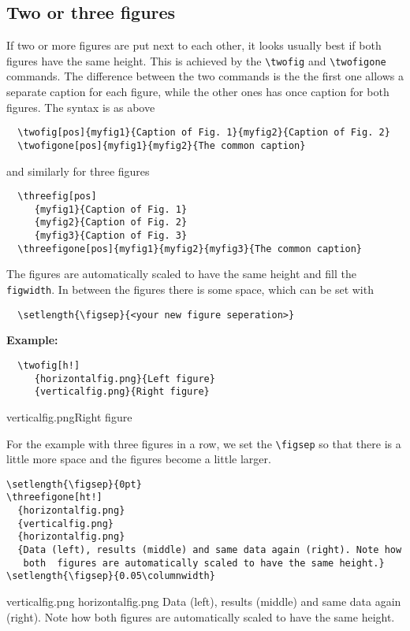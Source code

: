 \documentclass[a4paper,11pt]{article}
\begin{document}

\subsection{Two or three figures}
If two or more figures are put next to each other, it looks usually best if both figures
have the same height. This is achieved by the \verb|\twofig| and
\verb|\twofigone| commands. The difference between the two commands is the the
first one allows a separate caption for each figure, while the other ones has
once caption for both figures. The syntax is as above
\begin{verbatim}
  \twofig[pos]{myfig1}{Caption of Fig. 1}{myfig2}{Caption of Fig. 2}
  \twofigone[pos]{myfig1}{myfig2}{The common caption}
\end{verbatim}
and similarly for three figures
\begin{verbatim}
  \threefig[pos]
     {myfig1}{Caption of Fig. 1}
     {myfig2}{Caption of Fig. 2}
     {myfig3}{Caption of Fig. 3}
  \threefigone[pos]{myfig1}{myfig2}{myfig3}{The common caption}
\end{verbatim}
The figures are automatically scaled to have the same height and fill the {\tt
figwidth}. In between the figures there is some space, which can be set with 
\begin{verbatim}
  \setlength{\figsep}{<your new figure seperation>}
\end{verbatim}

{\bf Example:}
\begin{verbatim}
  \twofig[h!]
     {horizontalfig.png}{Left figure}
     {verticalfig.png}{Right figure}
\end{verbatim}
   {verticalfig.png}{Right figure}

For the example with three figures in a row, we set the \verb|\figsep| so that
there is a little more space and the figures become a little larger.
\begin{verbatim}
\setlength{\figsep}{0pt}
\threefigone[ht!]
  {horizontalfig.png}
  {verticalfig.png}
  {horizontalfig.png}
  {Data (left), results (middle) and same data again (right). Note how
   both  figures are automatically scaled to have the same height.}
\setlength{\figsep}{0.05\columnwidth}
\end{verbatim}
\setlength{\figsep}{0em}
  {verticalfig.png}
  {horizontalfig.png}
  {Data (left), results (middle) and
same data again (right). Note how both figures are automatically scaled to have the
same height.}
\setlength{\figsep}{0.05\columnwidth}
\end{document}
